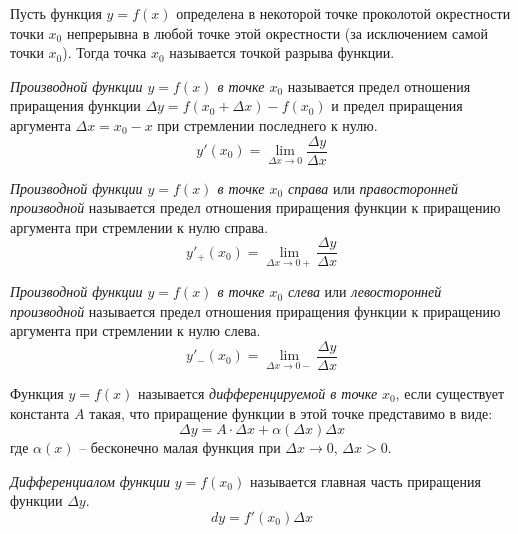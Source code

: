 \begin{definition} \label{def:56}
    Пусть функция $y = f(x)$ определена в некоторой точке проколотой окрестности точки $x_0$ непрерывна в любой точке этой окрестности (за исключением самой точки $x_0$).
    Тогда точка $x_0$ называется точкой разрыва функции.
\end{definition}


\begin{definition} \label{def:61}
    \textit{Производной функции $y = f(x)$ в точке $x_0$ } называется предел отношения приращения функции $\Delta y = f(x_0 + \Delta x) - f(x_0)$ и предел приращения аргумента $\Delta x = x_0 - x$  при стремлении последнего к нулю. \[
        y'(x_0) = \lim_{\Delta x \to 0} \frac{\Delta y}{\Delta x}
    \]
\end{definition}


\begin{definition} \label{def:62}
    \textit{Производной функции $y=f(x)$ в точке $x_0$ справа} или \textit{правосторонней производной} называется предел отношения приращения функции к приращению аргумента при стремлении к нулю справа. \[
        y'_+(x_0) = \lim_{\Delta x \to 0+} \frac{\Delta y}{\Delta x}
    \] 
\end{definition}


\begin{definition} \label{def:63}
    \textit{Производной функции $y=f(x)$ в точке $x_0$ слева} или \textit{левосторонней производной} называется предел отношения приращения функции к приращению аргумента при стремлении к нулю слева. \[
        y'_-(x_0) = \lim_{\Delta x \to 0-} \frac{\Delta y}{\Delta x}
    \] 
\end{definition}


\begin{definition} \label{def:64}
    Функция $y= f(x)$ называется \textit{дифференцируемой в точке} $x_0$, если существует константа $A$ такая, что приращение функции в этой точке представимо в виде: \[
        \Delta y = A \cdot \Delta x + \alpha(\Delta x) \Delta x
    \]
    где $\alpha(x)$ -- бесконечно малая функция при $\Delta x \to 0$, $\Delta x > 0$.
\end{definition}


\begin{definition} \label{def:65}
    \textit{Дифференциалом функции} $y = f(x_0)$ называется главная часть приращения функции $\Delta y$. \[
        dy = f'(x_0) \Delta x \tag{2}
    \] 
\end{definition}


